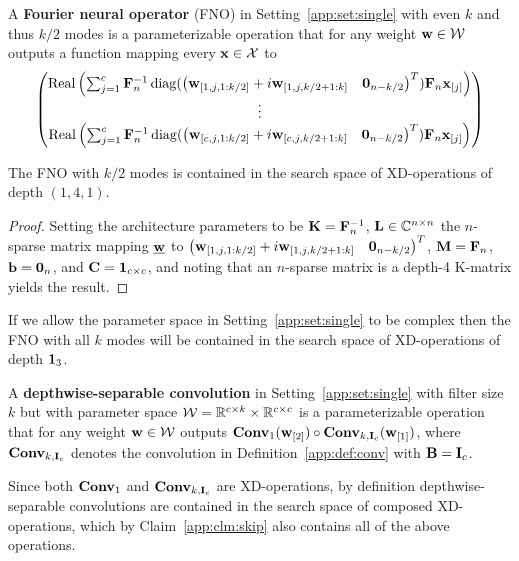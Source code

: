 \begin{Def}
	A {\bf Fourier neural operator} (FNO) \citep{li2021fno} in Setting~\ref{app:set:single} with even $k$ and thus $k/2$ modes is a parameterizable operation that for any weight $\mathbf{w}\in\mathcal W$ outputs a function mapping every $\mathbf{x}\in\mathcal X$ to 
	\begin{equation}
		\begin{pmatrix}
		\operatorname{\operatorname{Real}}\left(\sum_{j=1}^c\mathbf{F}_n^{-1}\operatorname{\operatorname{diag}}(\begin{pmatrix}\mathbf{w}_{[1,j,1:k/2]}+i\mathbf{w}_{[1,j,k/2+1:k]}&\mathbf 0_{n-k/2}\end{pmatrix}^T)\mathbf{F}_n\mathbf{x}_{[j]}\right)\\
		\vdots\\
		\operatorname{\operatorname{Real}}\left(\sum_{j=1}^c\mathbf{F}_n^{-1}\operatorname{\operatorname{diag}}(\begin{pmatrix}\mathbf{w}_{[c,j,1:k/2]}+i\mathbf{w}_{[c,j,k/2+1:k]}&\mathbf 0_{n-k/2}\end{pmatrix}^T)\mathbf{F}_n\mathbf{x}_{[j]}\right)
		\end{pmatrix}
	\end{equation}
\end{Def}
\begin{Clm}\label{app:clm:fno}
	The FNO with $k/2$ modes is contained in the search space of XD-operations of depth $(1,4,1)$.
\end{Clm}
\begin{proof}
	Setting the architecture parameters to be $\mathbf{K}=\mathbf{F}_n^{-1}$, $\mathbf{L}\in\mathbb C^{n\times n}$ the $n$-sparse matrix mapping $\underline{\mathbf{w}}$ to $\begin{pmatrix}\mathbf{w}_{[1,j,1:k/2]}+i\mathbf{w}_{[1,j,k/2+1:k]}&\mathbf 0_{n-k/2}\end{pmatrix}^T$, $\mathbf{M}=\mathbf{F}_n$, $\mathbf{b}=\mathbf 0_n$, and $\mathbf{C}=\mathbf 1_{c\times c}$, and noting that an $n$-sparse matrix is a depth-4 K-matrix \citep{dao2020kaleidoscope} yields the result.
\end{proof}
\begin{Rem}
	If we allow the parameter space in Setting~\ref{app:set:single} to be complex then the FNO with all $k$ modes will be contained in the search space of XD-operations of depth $\mathbf 1_3$.
\end{Rem}

\begin{Def}
	A {\bf depthwise-separable convolution} in Setting~\ref{app:set:single} with filter size $k$ but with parameter space $\mathcal W=\mathbb R^{c\times k}\times\mathbb R^{c\times c}$ is a parameterizable operation that for any weight $\mathbf{w}\in\mathcal W$ outputs $\operatorname{\operatorname{\bf Conv}}_1(\mathbf{w}_{[2]})\circ\operatorname{\operatorname{\bf Conv}}_{k,\mathbf{I}_c}(\mathbf{w}_{[1]})$, where $\operatorname{\operatorname{\bf Conv}}_{k,\mathbf{I}_c}$ denotes the convolution in Definition~\ref{app:def:conv} with $\mathbf{B}=\mathbf{I}_c$.
\end{Def}
\begin{Rem}
	Since both $\operatorname{\operatorname{\bf Conv}}_1$ and $\operatorname{\operatorname{\bf Conv}}_{k,\mathbf{I}_c}$ are XD-operations, by definition depthwise-separable convolutions are contained in the search space of composed XD-operations, which by Claim~\ref{app:clm:skip} also contains all of the above operations.
\end{Rem}